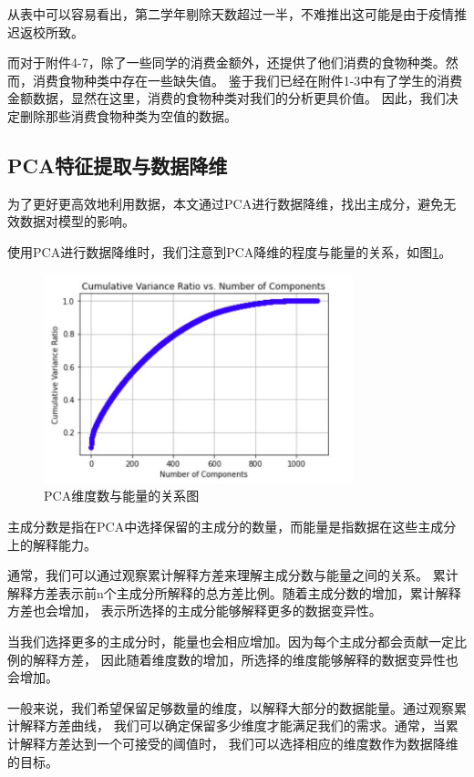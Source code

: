 \documentclass{article}
\begin{document}
从表中可以容易看出，第二学年剔除天数超过一半，不难推出这可能是由于疫情推迟返校所致。

而对于附件4-7，除了一些同学的消费金额外，还提供了他们消费的食物种类。然而，消费食物种类中存在一些缺失值。
鉴于我们已经在附件1-3中有了学生的消费金额数据，显然在这里，消费的食物种类对我们的分析更具价值。
因此，我们决定删除那些消费食物种类为空值的数据。

\subsection{PCA特征提取与数据降维}

为了更好更高效地利用数据，本文通过PCA进行数据降维，找出主成分，避免无效数据对模型的影响。

使用PCA进行数据降维时，我们注意到PCA降维的程度与能量的关系，如图\ref*{dim_num_and_energy}。

\begin{figure}[htbp]
  \centering
  \includegraphics[width=0.8\textwidth]{energy and dim number.png}
  \caption{PCA维度数与能量的关系图}
  \label{dim_num_and_energy}
\end{figure}

主成分数是指在PCA中选择保留的主成分的数量，而能量是指数据在这些主成分上的解释能力。

通常，我们可以通过观察累计解释方差来理解主成分数与能量之间的关系。
累计解释方差表示前n个主成分所解释的总方差比例。随着主成分数的增加，累计解释方差也会增加，
表示所选择的主成分能够解释更多的数据变异性。\cite{reference10}

当我们选择更多的主成分时，能量也会相应增加。因为每个主成分都会贡献一定比例的解释方差，
因此随着维度数的增加，所选择的维度能够解释的数据变异性也会增加。

一般来说，我们希望保留足够数量的维度，以解释大部分的数据能量。通过观察累计解释方差曲线，
我们可以确定保留多少维度才能满足我们的需求。通常，当累计解释方差达到一个可接受的阈值时，
我们可以选择相应的维度数作为数据降维的目标。
\end{document}
